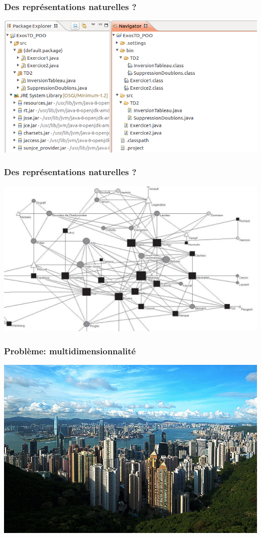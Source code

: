 \documentclass[11pt]{beamer}
\newenvironment{slide}[1]{%
\begin{frame}[environment=slide]
\frametitle{#1}
}{%
\end{frame}
}
\begin{document}
\begin{slide}{Des représentations naturelles ?}

\includegraphics[scale=0.35]{files}

\end{slide}

\begin{slide}{Des représentations naturelles ?}

\includegraphics[scale=0.6]{dudouet}

\end{slide}

\begin{slide}{Problème: multidimensionnalité}

\begin{center}

\includegraphics[scale=0.95]{hongkong}

\end{center}
\end{slide}
\end{document}
